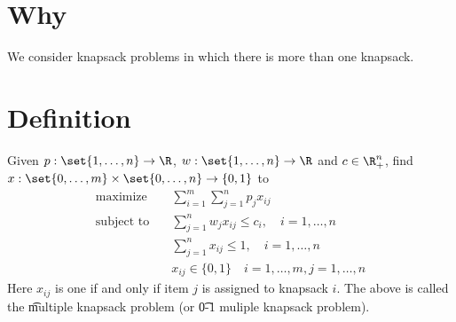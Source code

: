 
\section*{Why}

We consider knapsack problems in which there is more than one knapsack.

\section*{Definition}

Given $p: \set{1, \dots , n} \to \R $, $w: \set{1, \dots , n} \to \R $ and $c \in \R _+^n$, find $x: \set{0,\dots ,m} \times \set{0, \dots , n} \to \{0,1\}$ to
\[
\begin{aligned}
\text{maximize} & \quad \textstyle \sum_{i = 1}^m \sum_{j = 1}^{n} p_j x_{ij} \\
\text{subject to} & \quad \textstyle \sum_{j = 1}^n w_jx_{ij} \leq c_i , \quad i = 1, \dots , n\\
& \quad \textstyle \sum_{j = 1}^{n} x_{ij} \leq 1, \quad i = 1, \dots , n \\
& \quad x_{ij} \in \{0,1\} \quad i = 1, \dots , m, j = 1, \dots , n
\end{aligned}
\]
Here $x_{ij}$ is one if and only if item $j$ is assigned to knapsack $i$.
The above is called the \t{multiple knapsack problem} (or \t{0-1 muliple knapsack problem}).

\blankpage